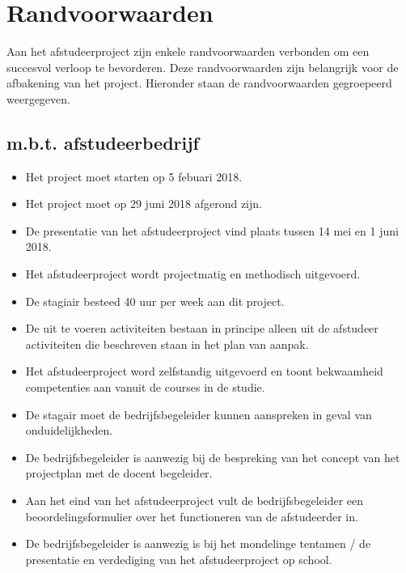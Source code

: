 \chapter{Randvoorwaarden}
Aan het afstudeerproject zijn enkele randvoorwaarden verbonden om een succesvol verloop te bevorderen. Deze randvoorwaarden zijn belangrijk voor de afbakening van het project. Hieronder staan de randvoorwaarden gegroepeerd weergegeven.

\section{m.b.t. afstudeerbedrijf}
\begin{itemize}
  \item Het project moet starten op 5 febuari 2018.
  \item Het project moet op 29 juni 2018 afgerond zijn.
  \item De presentatie van het afstudeerproject vind plaats tussen 14 mei en 1 juni 2018.
  \item Het afstudeerproject wordt projectmatig en methodisch uitgevoerd.
  \item De stagiair besteed 40 uur per week aan dit project.
  \item De uit te voeren activiteiten bestaan in principe alleen uit de afstudeer activiteiten die beschreven staan in het plan van aanpak.
  \item Het afstudeerproject word zelfstandig uitgevoerd en toont bekwaamheid competenties aan vanuit de courses in de studie.
  \item De stagair moet de bedrijfsbegeleider kunnen aanspreken in geval van onduidelijkheden.
  \item De bedrijfsbegeleider is aanwezig bij de bespreking van het concept van het projectplan met de docent begeleider.
  \item Aan het eind van het afstudeerproject vult de bedrijfsbegeleider een beoordelingsformulier over het functioneren van de afstudeerder in.
  \item De bedrijfsbegeleider is aanwezig is bij het mondelinge tentamen / de presentatie en verdediging van het afstudeerproject op school.
\end{itemize}

